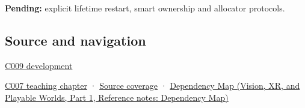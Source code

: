 \textbf{Pending:} explicit lifetime restart, smart ownership and allocator protocols.

\subsection{Source and navigation}\label{appendix-a82f9c438857-source-and-navigation}

\hypertarget{appendix-a82f9c438857-source-and-navigation}{}

\hyperref[appendix-fd090d982a15-m009---parts-127-147]{C009 development}

\hyperref[01-foundations-i-ch002-storage-is-a-place-an-object-is-its-occupant]{C007 teaching chapter} · \hyperref[appendix-fd090d982a15-m007---parts-101-112]{Source coverage} · \href{../07-Vision-XR-and-Playable-Worlds-P01/main.pdf\#nameddest=appendix-4ad47bdd269a}{Dependency Map (Vision, XR, and Playable Worlds, Part 1, Reference notes: Dependency Map)}
